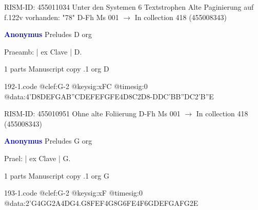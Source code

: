 \documentclass[twocolumn]{book}
\begin{document}
\newline RISM-ID: 455011034
\newline Unter den Systemen 6 Textstrophen
\newline Alte Paginierung auf f.122v vorhanden: "78"
\newline D-Fh  Ms 001
\newline $\rightarrow$ In collection 418 (455008343)

\newline \par \vspace{7pt} \textcolor{darkblue}{\textbf{Anonymus  }}
\newline Preludes  D  
\newline org
\newline \begin{itshape}[f.74v, at left:] Praeamb: | ex Clave | D.\end{itshape} 
\newline \textcolor{darkblue}{}  1 parts  
\newline Manuscript copy
.1  org  D  
\begin{filecontents*}{192-1.code}
@clef:G-2
@keysig:xFC
@timesig:0
@data:4'D{8DE}{FGAB}{''CDEF}{EFGF}E4D8C2D8-{DDC}{'BB''DC}2'B''E
\end{filecontents*}
\newline
%

\newline RISM-ID: 455010951
\newline Ohne alte Foliierung
\newline D-Fh  Ms 001
\newline $\rightarrow$ In collection 418 (455008343)

\newline \par \vspace{7pt} \textcolor{darkblue}{\textbf{Anonymus  }}
\newline Preludes  G  
\newline org
\newline \begin{itshape}[f.75v, at left:] Prael: | ex Clave | G.\end{itshape} 
\newline \textcolor{darkblue}{}  1 parts  
\newline Manuscript copy
.1  org  G  
\begin{filecontents*}{193-1.code}
@clef:G-2
@keysig:xF
@timesig:0
@data:2'G4GG2A4DG4.G8F{EF}4G{8G6FE}4F{6GDEF}{GAFG}2E
\end{filecontents*}
\newline
%
\end{document}
